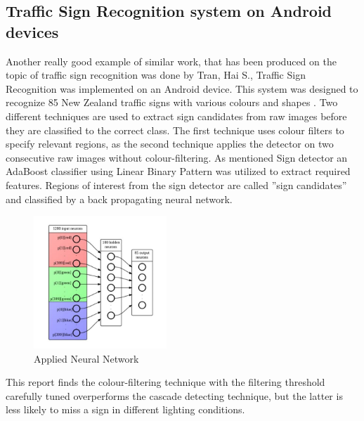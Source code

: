 \subsection{Traffic Sign Recognition system on Android devices}
Another really good example of similar work, that has been produced on the topic of traffic sign recognition was done by Tran, Hai S., Traffic Sign Recognition was implemented on an Android device. This system was designed to recognize 85 New Zealand traffic signs with various colours and shapes \cite{androidnn}. \newline
Two different techniques are used to extract sign candidates from raw images before they are classified to the correct class. The first technique uses colour filters to specify relevant regions, as the
second technique applies the detector on two consecutive raw images without colour-filtering. As mentioned Sign detector an AdaBoost classifier using Linear Binary Pattern was utilized to extract required features. Regions of interest from the sign detector are called ”sign candidates” and classified by a back propagating neural network. 

\begin{figure}[H]
	\centering
	\includegraphics[height=5cm]{images/tranNN.jpg}
	\caption{Applied Neural Network}
	\label{fig:tranNN}
\end{figure}




This report
finds the colour-filtering technique with the filtering threshold carefully tuned
overperforms the cascade detecting technique, but the latter is less likely to
miss a sign in different lighting conditions.

\fi

